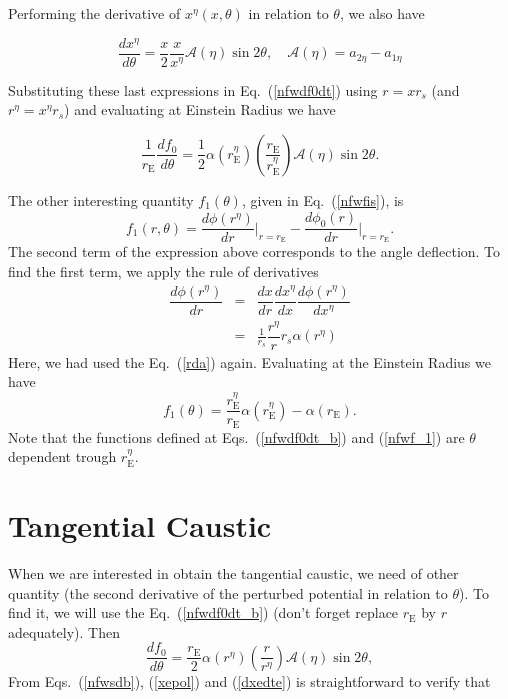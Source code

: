\documentclass[a4paper,twoside,prd]{revtex4}
\def \rs {r_s}
\def \ma {\mathcal{A}}
\def \re {r_{\mathrm{E}}}
\def \ren{r^\eta_{\mathrm{E}}}
\def \ret {r^\eta}
\def \po {\phi_0}
\def \al {\alpha}
\def \te {\theta}
\def \ae {a_{1\eta}}
\def \be {a_{2\eta}}
\def \xe {x^\eta}
\def \ree {r^\eta_{\mathrm{E}}}
\begin{document}
Performing the derivative of $\xe(x,\te)$ in relation to $\te$, we also have

\begin{equation}
\dfrac{d\xe}{d\te}=\frac{x}{2}\frac{x}{\xe}\ma(\eta)\sin{2\te}, \quad \ma(\eta)= \be-\ae
\label{dxedte}
\end{equation}

Substituting these last expressions in  Eq.~(\ref{nfwdf0dt}) using $r=x\rs$ (and $r^\eta=\xe\rs$) and evaluating at Einstein Radius we have

\begin{equation}
\frac{1}{\re}\dfrac{d f_0}{d\te}=\frac{1}{2}\al(\ree)\left(\dfrac{\re}{\ree}\right)\ma(\eta)\sin{2\te}.
\label{nfwdf0dt_b}
\end{equation}

The other interesting quantity $f_1(\te)$, given in Eq.~(\ref{nfwfis}), is
\begin{equation*}
f_1(r,\te)=\dfrac{d\phi(\ret)}{dr}{\Big|_{r=\re}}-\dfrac{d\po(r)}{dr}{\Big|_{r=\re}}.
\end{equation*}
The second term of the expression above corresponds to the angle deflection. To find the first term, we apply the rule of derivatives
\begin{eqnarray}
\dfrac{d\phi(\ret)}{dr}&=&\dfrac{dx}{dr}\dfrac{d\xe}{dx}\dfrac{d\phi(\ret)}{d\xe} \nonumber \\
                      &=&\frac{1}{\rs}\dfrac{\ret}{r}\rs\al(r^\eta)
\end{eqnarray}
Here, we had used the Eq.~(\ref{rda}) again. Evaluating at the Einstein Radius we have
\begin{equation}
f_1(\te)=\dfrac{\ren}{\re}\al(\ren)-\al(\re).
\label{nfwf_1}
\end{equation}
Note that the functions defined at Eqs.~(\ref{nfwdf0dt_b}) and (\ref{nfwf_1}) are $\te$ dependent trough $\ren$.

\section{\label{sec_caust} Tangential Caustic}

When we are interested in obtain the tangential caustic, we need of other quantity (the second derivative of the perturbed potential in relation to $\te$). To find it, we will use the Eq.~(\ref{nfwdf0dt_b}) (don't forget replace $\re$ by $r$ adequately). Then
\begin{equation}
\dfrac{d f_0}{d\te}=\frac{\re}{2}\al(r^\eta)\left(\dfrac{r}{r^\eta}\right)\ma(\eta)\sin{2\te},
\label{nfwdf0dt_c}
\end{equation}
From Eqs.~(\ref{nfwsdb}), (\ref{xepol}) and (\ref{dxedte}) is straightforward to verify that
\end{document}
